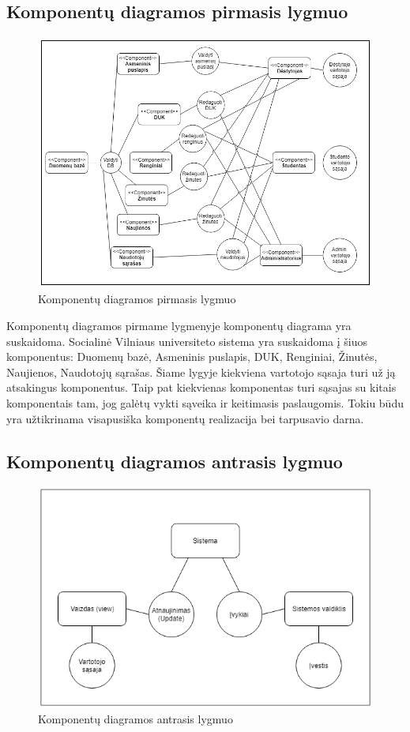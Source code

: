 \documentclass{VUMIFPSkursinis}
\begin{document}
\subsection{Komponentų diagramos pirmasis lygmuo}

\begin{figure}[H]
	\centering
	\includegraphics[width=\linewidth]{img/1lygmuo.png}
	\caption{Komponentų diagramos pirmasis lygmuo}
	\label{fig:0lygmuo}
\end{figure}

Komponentų diagramos pirmame lygmenyje komponentų diagrama yra suskaidoma. Socialinė Vilniaus universiteto sistema yra suskaidoma į šiuos komponentus: Duomenų bazė, Asmeninis puslapis, DUK, Renginiai, Žinutės, Naujienos, Naudotojų sąrašas. Šiame lygyje kiekviena vartotojo sąsaja turi už ją atsakingus komponentus. Taip pat kiekvienas komponentas turi sąsajas su kitais komponentais tam, jog galėtų vykti sąveika ir keitimasis paslaugomis. Tokiu būdu yra užtikrinama visapusiška komponentų realizacija bei tarpusavio darna.

\subsection{Komponentų diagramos antrasis lygmuo}

\begin{figure}[H]
	\centering
	\includegraphics[width=\linewidth]{img/2lygmuo.png}
	\caption{Komponentų diagramos antrasis lygmuo}
	\label{fig:0lygmuo}
\end{figure}
\end{document}
